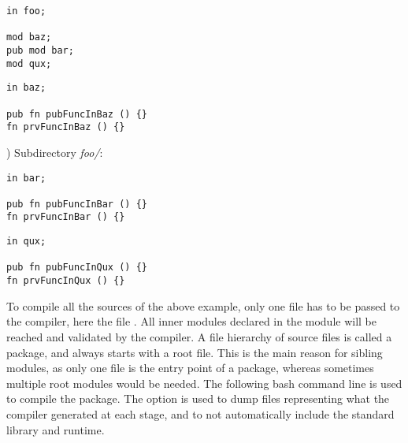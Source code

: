 \vspace{-5pt}%
\begin{minipage}[t][][t]{0.47\linewidth}
\begin{lstlisting}[caption=\textit{./foo.yr}, style=coloredverbatim]
in foo;

mod baz;
pub mod bar;
mod qux;

\end{lstlisting}
\end{minipage}\hspace{5pt}%
\begin{minipage}[t][][t]{0.47\linewidth}
\begin{lstlisting}[caption=\textit{./baz.yr}, style=coloredverbatim]
in baz;

pub fn pubFuncInBaz () {}
fn prvFuncInBaz () {}
\end{lstlisting}
\end{minipage}


) Subdirectory \textit{foo/}:

\vspace{-5pt}%
\begin{minipage}[t][][t]{0.47\linewidth}
\begin{lstlisting}[caption=\textit{./foo/bar.yr}, style=coloredverbatim]
in bar;

pub fn pubFuncInBar () {}
fn prvFuncInBar () {}
\end{lstlisting}
\end{minipage}\hspace{5pt}%
\begin{minipage}[t][][t]{0.47\linewidth}
\begin{lstlisting}[caption=\textit{./foo/qux.yr}, style=coloredverbatim]
in qux;

pub fn pubFuncInQux () {}
fn prvFuncInQux () {}
\end{lstlisting}
\end{minipage}


To compile all the sources of the above example, only one file has to be passed
to the compiler, here the file . All inner modules declared in
the  module will be reached and validated by the compiler. A file
hierarchy of source files is called a package, and always starts with a root
file. This is the main reason for sibling modules, as only one file is the entry
point of a package, whereas sometimes multiple root modules would be needed. The
following bash command line is used to compile the package. The
 option is used to dump files representing what the compiler
generated at each stage, and  to not automatically include the
standard library and runtime.

